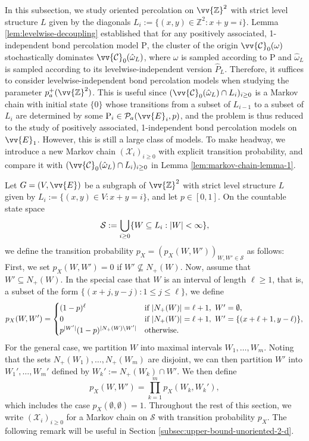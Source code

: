 \documentclass[11pt]{article}
\renewcommand{\P}{\mathrm{P}}
\newcommand{\Z}{\mathbb{Z}}
\DeclarePairedDelimiter{\abs}{\lvert}{\rvert}
\theoremstyle{remark}
\begin{document}
In this subsection, we study oriented percolation on $\vv{\Z}^2$ with  strict level structure $L$ given by the diagonals $L_i := \{(x,y) \in \Z^2 : x+y=i \}$. Lemma \ref{lem:levelwise-decoupling} established that for any positively associated, 1-independent bond percolation model $\P$, the cluster of the origin $\vv{\mathcal C}_0(\omega)$ stochastically dominates $\vv{\mathcal C}_0(\hat{\omega}_L)$, where $\omega$ is sampled according to $\P$ and $\hat{\omega}_L$ is sampled according to its levelwise-independent version $\hat{P}_L$. Therefore, it suffices to consider levelwise-independent bond percolation models when studying the parameter  $p_a^+(\vv{\Z}^2)$. This is useful since $(\vv{\mathcal C}_0(\hat{\omega}_L) \cap L_i)_{i\ge 0}$ is a Markov chain with initial state $\{0\}$ whose transitions from a subset of $L_{i-1}$ to a subset of $L_{i}$ are determined by some $\P_{i} \in \mathcal P_a(\vv{E}_i,p)$, and the problem is thus reduced to the study of positively associated, 1-independent bond percolation models on $\vv{E}_1$. However, this is still a large class of models. To make headway, we introduce a new Markov chain $(\mathcal X_i)_{i\ge 0}$ with explicit transition probability, and compare it with $(\vv{\mathcal C}_0(\hat{\omega}_L) \cap L_i)_{i\ge 0}$  in Lemma \ref{lem:markov-chain-lemma-1}.

Let $G=(V,\vv{E})$ be a subgraph of $\vv{\Z}^2$ with  strict level structure $L$ given by $L_i := \{(x,y) \in V : x+y=i \}$, and let $p \in [0,1]$. On the countable state space 
\begin{equation}\label{eq:state-space-X}
	\mathcal S := \bigcup_{i\ge 0} \{W \subseteq L_i : \abs{W}<\infty\},
\end{equation}
we define the transition probability $p_X = (p_X(W,W'))_{W,W' \in \mathcal S}$ as follows: First, we set $p_X(W,W') = 0$ if $W' \nsubseteq N_+(W)$. Now, assume that $W' \subseteq N_+(W)$. In the special case that $W$ is an interval of length $\ell\ge 1$, that is, a subset of the form $\{(x+j,y-j):1 \le j \le \ell\}$, we define
\begin{equation}
	p_X(W,W') = \begin{cases}
		(1-p)^\ell &\text{if}\  \abs{N_+(W)} = \ell + 1,\ W' = \emptyset,\\
		0 &\text{if}\  \abs{N_+(W)} = \ell + 1,\ W' = \{(x+\ell+1,y-\ell)\},\\
		p^{\abs{W'}} (1-p)^{\abs{N_+(W)\setminus W'}}  &\text{otherwise}.
	\end{cases}
\end{equation}
For the general case, we partition $W$ into maximal intervals $W_1,\ldots,W_m$. Noting that the sets $N_+(W_1),\ldots,N_+(W_m)$ are disjoint, we can then partition $W'$ into $W_1',\ldots,W_m'$ defined by $W_k' := N_+(W_k) \cap W'$. We then define
\begin{equation}\label{eq:markov-chain-product-form}
	p_X(W,W') = \prod_{k=1}^{m} p_X(W_k,W_k'),
\end{equation}
which includes the case $p_X(\emptyset,\emptyset)=1$. Throughout the rest of this section, we write $(\mathcal X_i)_{i\ge 0}$ for a Markov chain on $\mathcal S$ with transition probability $p_X$. The following remark will be useful in Section \ref{subsec:upper-bound-unoriented-2-d}.
\end{document}
